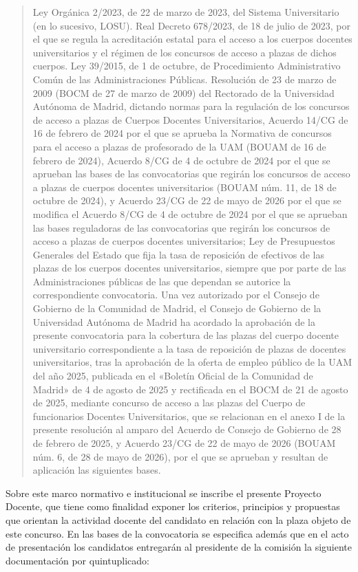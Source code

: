 \documentclass[
  11pt,
  a4paper,
  twoside]{scrreprt}
\begin{document}
\begin{quote}
Ley Orgánica 2/2023, de 22 de marzo de 2023, del Sistema Universitario
(en lo sucesivo, LOSU). Real Decreto 678/2023, de 18 de julio de 2023,
por el que se regula la acreditación estatal para el acceso a los
cuerpos docentes universitarios y el régimen de los concursos de acceso
a plazas de dichos cuerpos. Ley 39/2015, de 1 de octubre, de
Procedimiento Administrativo Común de las Administraciones Públicas.
Resolución de 23 de marzo de 2009 (BOCM de 27 de marzo de 2009) del
Rectorado de la Universidad Autónoma de Madrid, dictando normas para la
regulación de los concursos de acceso a plazas de Cuerpos Docentes
Universitarios, Acuerdo 14/CG de 16 de febrero de 2024 por el que se
aprueba la Normativa de concursos para el acceso a plazas de profesorado
de la UAM (BOUAM de 16 de febrero de 2024), Acuerdo 8/CG de 4 de octubre
de 2024 por el que se aprueban las bases de las convocatorias que
regirán los concursos de acceso a plazas de cuerpos docentes
universitarios (BOUAM núm. 11, de 18 de octubre de 2024), y Acuerdo
23/CG de 22 de mayo de 2026 por el que se modifica el Acuerdo 8/CG de 4
de octubre de 2024 por el que se aprueban las bases reguladoras de las
convocatorias que regirán los concursos de acceso a plazas de cuerpos
docentes universitarios; Ley de Presupuestos Generales del Estado que
fija la tasa de reposición de efectivos de las plazas de los cuerpos
docentes universitarios, siempre que por parte de las Administraciones
públicas de las que dependan se autorice la correspondiente
convocatoria. Una vez autorizado por el Consejo de Gobierno de la
Comunidad de Madrid, el Consejo de Gobierno de la Universidad Autónoma
de Madrid ha acordado la aprobación de la presente convocatoria para la
cobertura de las plazas del cuerpo docente universitario correspondiente
a la tasa de reposición de plazas de docentes universitarios, tras la
aprobación de la oferta de empleo público de la UAM del año 2025,
publicada en el «Boletín Oficial de la Comunidad de Madrid» de 4 de
agosto de 2025 y rectificada en el BOCM de 21 de agosto de 2025,
mediante concurso de acceso a las plazas del Cuerpo de funcionarios
Docentes Universitarios, que se relacionan en el anexo I de la presente
resolución al amparo del Acuerdo de Consejo de Gobierno de 28 de febrero
de 2025, y Acuerdo 23/CG de 22 de mayo de 2026 (BOUAM núm. 6, de 28 de
mayo de 2026), por el que se aprueban y resultan de aplicación las
siguientes bases.
\end{quote}

Sobre este marco normativo e institucional se inscribe el presente
Proyecto Docente, que tiene como finalidad exponer los criterios,
principios y propuestas que orientan la actividad docente del candidato
en relación con la plaza objeto de este concurso. En las bases de la
convocatoria se especifica además que en el acto de presentación los
candidatos entregarán al presidente de la comisión la siguiente
documentación por quintuplicado:
\end{document}
